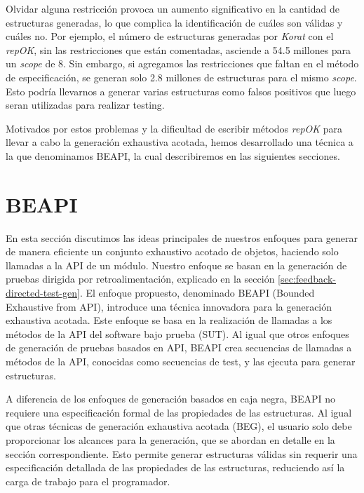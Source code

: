 Olvidar alguna restricción provoca un aumento significativo en la cantidad de estructuras generadas, lo que complica la identificación de cuáles son válidas y cuáles no. Por ejemplo, el número de estructuras generadas por \emph{Korat} con el \emph{repOK}, sin las restricciones que están comentadas, asciende a 54.5 millones para un \emph{scope} de 8. Sin embargo, si agregamos las restricciones que faltan en el método de especificación, se generan solo 2.8 millones de estructuras para el mismo \emph{scope}. Esto podría llevarnos a generar varias estructuras como falsos positivos que luego seran utilizadas para realizar testing.

Motivados por estos problemas y la dificultad de escribir métodos \emph{repOK} para llevar a cabo la generación exhaustiva acotada, hemos desarrollado una técnica a la que denominamos BEAPI, la cual describiremos en las siguientes secciones.



\section[BEAPI]{BEAPI}
\label{sec:beapiIntro}

En esta sección discutimos las ideas principales de nuestros enfoques para generar de manera eficiente un conjunto exhaustivo acotado de objetos, haciendo solo llamadas a la API de un módulo. Nuestro enfoque se basan en la generación de pruebas dirigida por retroalimentación, explicado en la sección \ref{sec:feedback-directed-test-gen}.
El enfoque propuesto, denominado \textsf{BEAPI} (Bounded Exhaustive from API), introduce una técnica innovadora para la generación exhaustiva acotada. Este enfoque se basa en la realización de llamadas a los métodos de la API del software bajo prueba (SUT). Al igual que otros enfoques de generación de pruebas basados en API, \textsf{BEAPI} crea secuencias de llamadas a métodos de la API, conocidas como secuencias de test, y las ejecuta para generar estructuras. 

A diferencia de los enfoques de generación basados en caja negra, \textsf{BEAPI} no requiere una especificación formal de las propiedades de las estructuras. Al igual que otras técnicas de generación exhaustiva acotada (BEG), el usuario solo debe proporcionar los alcances para la generación, que se abordan en detalle en la sección correspondiente.  Esto permite generar estructuras válidas sin requerir una especificación detallada de las propiedades de las estructuras, reduciendo así la carga de trabajo para el programador.

